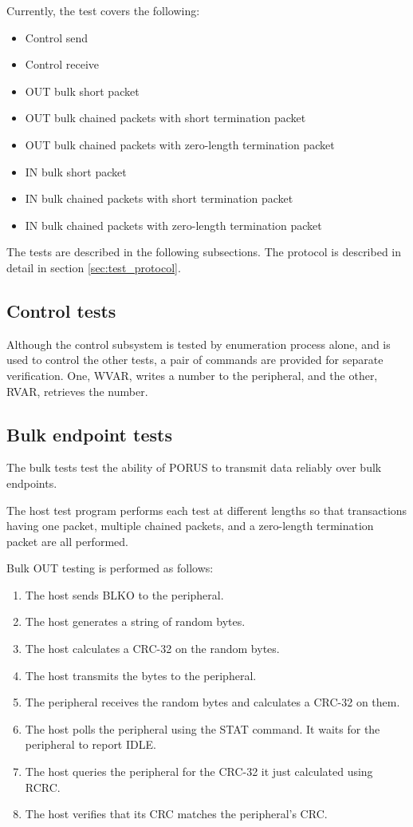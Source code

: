 \documentclass{book}
\begin{document}
Currently, the test covers the following:

\begin{itemize}
\item Control send
\item Control receive
\item OUT bulk short packet
\item OUT bulk chained packets with short termination packet
\item OUT bulk chained packets with zero-length termination packet
\item IN bulk short packet
\item IN bulk chained packets with short termination packet
\item IN bulk chained packets with zero-length termination packet
\end{itemize}

The tests are described in the following subsections.  The protocol is described in detail in section \ref{sec:test_protocol}.

\subsection{Control tests}

Although the control subsystem is tested by enumeration process alone, and is used to control the other tests, a pair of commands are provided for separate verification.  One, WVAR, writes a number to the peripheral, and the other, RVAR, retrieves the number.

\subsection{Bulk endpoint tests}
\label{sec_bulktest}

The bulk tests test the ability of PORUS to transmit data reliably over bulk endpoints.

The host test program performs each test at different lengths so that transactions having one packet, multiple chained packets, and a zero-length termination packet are all performed.

Bulk OUT testing is performed as follows:

\begin{enumerate}
\item The host sends BLKO to the peripheral.
\item The host generates a string of random bytes.
\item The host calculates a CRC-32 on the random bytes.
\item The host transmits the bytes to the peripheral.
\item The peripheral receives the random bytes and calculates a CRC-32 on them.
\item The host polls the peripheral using the STAT command.  It waits for the peripheral to report IDLE.
\item The host queries the peripheral for the CRC-32 it just calculated using RCRC.
\item The host verifies that its CRC matches the peripheral's CRC.
\end{enumerate}
\end{document}
